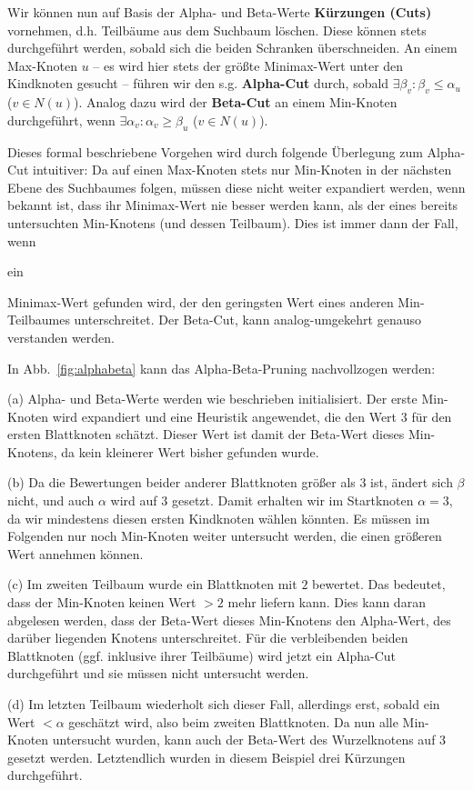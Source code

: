 \documentclass[a4paper]{scrartcl}
\newcommand\e[1]{\begin{em}#1\end{em}}
\begin{document}
Wir können nun auf Basis der Alpha- und Beta-Werte \textbf{Kürzungen (Cuts)} vornehmen, d.h. Teilbäume aus dem Suchbaum löschen. Diese können stets durchgeführt werden, sobald sich die beiden Schranken überschneiden. An einem Max-Knoten $u$ -- es wird hier stets der größte Minimax-Wert unter den Kindknoten gesucht --  führen wir den s.g. \textbf{Alpha-Cut} durch, sobald $\exists \beta_v : \beta_v \leq \alpha_u$ ($v \in N(u)$). Analog dazu wird der \textbf{Beta-Cut} an einem Min-Knoten durchgeführt, wenn $\exists \alpha_v : \alpha_v \geq \beta_u$ ($v \in N(u)$).

Dieses formal beschriebene Vorgehen wird durch folgende Überlegung zum Alpha-Cut intuitiver: Da auf einen Max-Knoten stets nur Min-Knoten in der nächsten Ebene des Suchbaumes folgen, müssen diese nicht weiter expandiert werden, wenn bekannt ist, dass ihr Minimax-Wert nie besser werden kann, als der eines bereits untersuchten Min-Knotens (und dessen Teilbaum). Dies ist immer dann der Fall, wenn \e{ein} Minimax-Wert gefunden wird, der den geringsten Wert eines anderen Min-Teilbaumes unterschreitet. Der Beta-Cut, kann analog-umgekehrt genauso verstanden werden.

In Abb.~\ref{fig:alphabeta} kann das Alpha-Beta-Pruning nachvollzogen werden: 

(a) Alpha- und Beta-Werte werden wie beschrieben initialisiert. Der erste Min-Knoten wird expandiert und eine Heuristik angewendet, die den Wert $3$ für den ersten Blattknoten schätzt. Dieser Wert ist damit der Beta-Wert dieses Min-Knotens, da kein kleinerer Wert bisher gefunden wurde. 

(b) Da die Bewertungen beider anderer Blattknoten größer als $3$ ist, ändert sich $\beta$ nicht, und auch $\alpha$ wird auf $3$ gesetzt. Damit erhalten wir im Startknoten $\alpha = 3$, da wir mindestens diesen ersten Kindknoten wählen könnten. Es müssen im Folgenden nur noch Min-Knoten weiter untersucht werden, die einen größeren Wert annehmen können. 

(c) Im zweiten Teilbaum wurde ein Blattknoten mit $2$ bewertet. Das bedeutet, dass der Min-Knoten keinen Wert $> 2$ mehr liefern kann. Dies kann daran abgelesen werden, dass der Beta-Wert dieses Min-Knotens den Alpha-Wert, des darüber liegenden Knotens unterschreitet. Für die verbleibenden beiden Blattknoten (ggf. inklusive ihrer Teilbäume) wird jetzt ein Alpha-Cut durchgeführt und sie müssen nicht untersucht werden. 

(d) Im letzten Teilbaum wiederholt sich dieser Fall, allerdings erst, sobald ein Wert $< \alpha$ geschätzt wird, also beim zweiten Blattknoten. Da nun alle Min-Knoten untersucht wurden, kann auch der Beta-Wert des Wurzelknotens auf $3$ gesetzt werden. Letztendlich wurden in diesem Beispiel drei Kürzungen durchgeführt.
\end{document}
